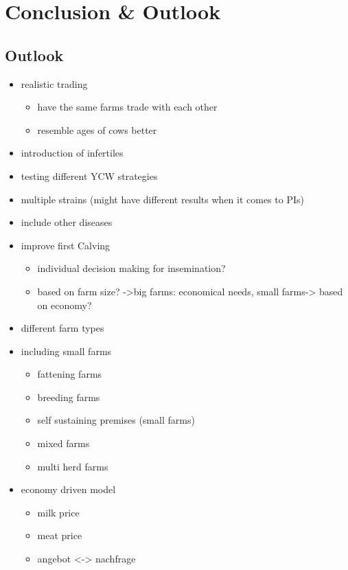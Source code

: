 \chapter{Conclusion \& Outlook}
\section{Outlook}
\begin{itemize}
\item realistic trading
\begin{itemize}
\item have the same farms trade with each other
\item resemble ages of cows better
\end{itemize}
\item introduction of infertiles
\item testing different YCW strategies
\item multiple strains (might have different results when it comes to PIs)
\item include other diseases 
\item improve first Calving 
\begin{itemize}
\item individual decision making for insemination? 
\item based on farm size? ->big farms: economical needs, small farms-> based on economy?
\end{itemize}
\item different farm types
\item including small farms
\begin{itemize}
\item fattening farms
\item breeding farms
\item self sustaining premises (small farms)
\item mixed farms
\item multi herd farms
\end{itemize}

\item economy driven model
\begin{itemize}
\item milk price
\item meat price
\item angebot <-> nachfrage
\end{itemize}
\end{itemize}


